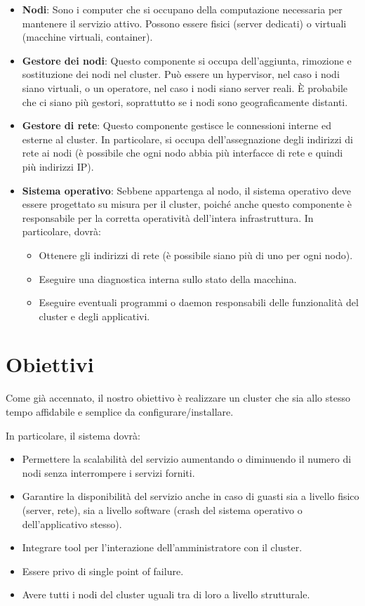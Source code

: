 \documentclass[a4paper]{article}
\begin{document}
\begin{itemize}
    \item \textbf{Nodi}: Sono i computer che si occupano della computazione necessaria per mantenere il servizio attivo. Possono essere fisici (server dedicati) o virtuali (macchine virtuali, container).
    \item \textbf{Gestore dei nodi}: Questo componente si occupa dell'aggiunta, rimozione e sostituzione dei nodi nel cluster. Può essere un hypervisor, nel caso i nodi siano virtuali, o un operatore, nel caso i nodi siano server reali. È probabile che ci siano più gestori, soprattutto se i nodi sono geograficamente distanti.
    \item \textbf{Gestore di rete}: Questo componente gestisce le connessioni interne ed esterne al cluster. In particolare, si occupa dell'assegnazione degli indirizzi di rete ai nodi (è possibile che ogni nodo abbia più interfacce di rete e quindi più indirizzi IP).
    \item \textbf{Sistema operativo}: Sebbene appartenga al nodo, il sistema operativo deve essere progettato su misura per il cluster, poiché anche questo componente è responsabile per la corretta operatività dell'intera infrastruttura. In particolare, dovrà:
    \begin{itemize}
        \item Ottenere gli indirizzi di rete (è possibile siano più di uno per ogni nodo).
        \item Eseguire una diagnostica interna sullo stato della macchina.
        \item Eseguire eventuali programmi o daemon responsabili delle funzionalità del cluster e degli applicativi.
    \end{itemize}
\end{itemize}

\section{Obiettivi}
Come già accennato, il nostro obiettivo è realizzare un cluster che sia allo stesso tempo affidabile e semplice da configurare/installare.

In particolare, il sistema dovrà:
\begin{itemize}
    \item Permettere la scalabilità del servizio aumentando o diminuendo il numero di nodi senza interrompere i servizi forniti.
    \item Garantire la disponibilità del servizio anche in caso di guasti sia a livello fisico (server, rete), sia a livello software (crash del sistema operativo o dell'applicativo stesso).
    \item Integrare tool per l'interazione dell'amministratore con il cluster.
    \item Essere privo di single point of failure.
    \item Avere tutti i nodi del cluster uguali tra di loro a livello strutturale.
\end{itemize}
\end{document}
